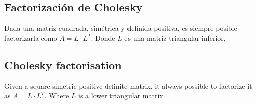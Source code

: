 \begin{paracol}{2}
\subsection{Factorización de Cholesky}\label{chol}
Dada una matriz cuadrada, simétrica y definida positiva, es siempre posible factorizarla como $A=L\cdot L^T$. Donde $L$ es una matriz triangular inferior,
\switchcolumn
\subsection{Cholesky factorisation}
Given a square simetric positive definite matrix, it always possible to factorize it as $A=L\cdot L^T$. Where $L$ is a lower triangular matrix.
\end{paracol}

